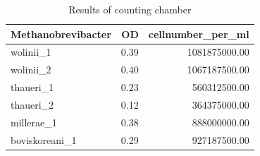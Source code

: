 \begin{table}[ht]
\centering
\caption{Results of counting chamber} 
\label{tab:cellnumb}
\begin{tabular}{lrr}
  \toprule
Methanobrevibacter & OD & cellnumber\_per\_ml \\ 
  \midrule
wolinii\_1 & 0.39 & 1081875000.00 \\ 
  wolinii\_2 & 0.40 & 1067187500.00 \\ 
  thaueri\_1 & 0.23 & 560312500.00 \\ 
  thaueri\_2 & 0.12 & 364375000.00 \\ 
  millerae\_1 & 0.38 & 888000000.00 \\ 
  boviskoreani\_1 & 0.29 & 927187500.00 \\ 
   \bottomrule
\end{tabular}
\end{table}
